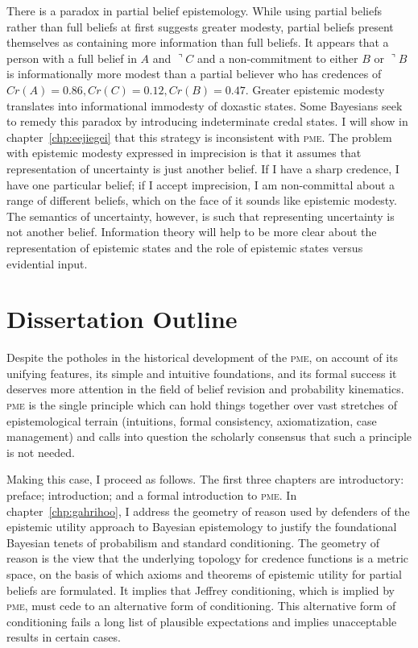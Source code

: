 \documentclass[phd,12pt,oneside]{ubcthesis}
\begin{document}
There is a  paradox in partial belief
epistemology. While using partial beliefs rather than full beliefs at
first suggests greater modesty, partial beliefs present themselves as
containing more information than full beliefs. It appears that a
person with a full belief in $A$ and $\urcorner{}C$ and a
non-commitment to either $B$ or $\urcorner{}B$ is informationally more
modest than a partial believer who has credences of
$Cr(A)=0.86,Cr(C)=0.12,Cr(B)=0.47$. Greater epistemic modesty
translates into informational immodesty of doxastic states. Some
Bayesians seek to remedy this paradox by introducing indeterminate
credal states. I will show in chapter~\ref{chp:eejiegei} that this
strategy is inconsistent with \textsc{pme}. The problem with epistemic
modesty expressed in imprecision is that it assumes that
representation of uncertainty is just another belief. If I have a
sharp credence, I have one particular belief; if I accept imprecision,
I am non-committal about a range of different beliefs, which on the
face of it sounds like epistemic modesty. The semantics of
uncertainty, however, is such that representing uncertainty is not
another belief. Information theory will help to be more clear about
the representation of epistemic states and the role of epistemic
states versus evidential input.

\section{Dissertation Outline}
\label{sec:cohwaefi}

Despite the potholes in the historical development of the
\textsc{pme}, on account of its unifying features, its simple and
intuitive foundations, and its formal success it deserves more
attention in the field of belief revision and probability kinematics.
\textsc{pme} is the single principle which can hold things together
over vast stretches of epistemological terrain (intuitions, formal
consistency, axiomatization, case management) and calls into question
the scholarly consensus that such a principle is not needed.

Making this case, I proceed as follows. The first three chapters are
introductory: preface; introduction; and a formal introduction to
\textsc{pme}. In chapter~\ref{chp:gahrihoo}, I address the geometry of
reason used by defenders of the epistemic utility approach to Bayesian
epistemology to justify the foundational Bayesian tenets of
probabilism and standard conditioning. The geometry of reason is the
view that the underlying topology for credence functions is a metric
space, on the basis of which axioms and theorems of epistemic utility
for partial beliefs are formulated. It implies that Jeffrey
conditioning, which is implied by \textsc{pme}, must cede to an
alternative form of conditioning. This alternative form of
conditioning fails a long list of plausible expectations and implies
unacceptable results in certain cases.
\end{document}
